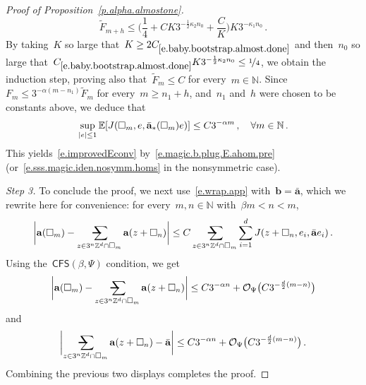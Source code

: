 \documentclass[11pt,twoside]{article} %
\makeatletter
\let\oldsquare\square %
\renewcommand{\square}{\oldsquare}
\numberwithin{equation}{section}
\theoremstyle{definition}
\let\originalleft\left
\let\originalright\right
\renewcommand{\left}{\mathopen{}\mathclose\bgroup\originalleft}
\renewcommand{\right}{\aftergroup\egroup\originalright}
\newcommand*{\N}{\ensuremath{\mathbb{N}}}
\newcommand*{\Zd}{\ensuremath{\mathbb{Z}^d}}
\renewcommand*{\tilde}{\widetilde}
\renewcommand{\b}{\ensuremath{\mathbf{b}}}
\renewcommand{\a}{\mathbf{a}}
\newcommand{\ahom}{\bar{\a}}
\newcommand{\cu}{\square}
\newcommand{\E}{\mathbb{E}}
\renewcommand{\O}{\mathcal{O}}
\newcommand{\avsum}{\mathop{\mathpalette\avsuminner\relax}\displaylimits}
\newcommand\avsuminner[2]{%
  {\sbox0{$\m@th#1\sum$}%
   \vphantom{\usebox0}%
   \ooalign{%
     \hidewidth
     \smash{\,\rule[.23em]{8.8pt}{1.1pt} \relax}%
     \hidewidth\cr
   ~$\m@th#1\sum$\cr
   }%
  }%
}
\newcommand{\CFS}{\mathsf{CFS}}
\makeatother
\begin{document}
\begin{proof}[{Proof of Proposition~\ref{p.alpha.almostone}}]
\begin{equation} 
\label{e.baby.bootstrap.almost.done}
\tilde{F}_{m+h}  \leq \biggl( \frac14 + CK3^{- \frac{1}{2} \kappa_2 n_0} + \frac{C}{K}\biggr) K 3^{-\kappa_1 n_0} \,.
\end{equation}
By taking~$K$ so large that~$ K \geq 2 C_{\eqref{e.baby.bootstrap.almost.done}}$ and then~$n_0$ so large that~$C_{\eqref{e.baby.bootstrap.almost.done}}K3^{- \frac{1}{2} \kappa_2 n_0} \leq \nicefrac14$, we obtain the induction step, proving also that~$\tilde F_{m} \leq C$ for every~$m\in\N$.
Since~$F_m \leq 3^{-\alpha (m-n_1)} \tilde{F}_m$ for every~$m\geq n_1+h$, and~$n_1$ and~$h$ were chosen to be constants above, we deduce that 
\begin{equation}
\label{e.good.J.bound.bootbark}
\sup_{|e| \leq 1}\E \left[ J(\cu_{m},e, \ahom_*(\cu_{m})  e) \right]
\leq 
C 3^{-\alpha m}\,, \quad \forall m\in\N\,.
\end{equation}
This yields~\eqref{e.improvedEconv} by~\eqref{e.magic.b.plug.E.ahom.pre} (or~\eqref{e.sss.magic.iden.nosymm.homs} in the nonsymmetric case). 

\smallskip

\emph{Step 3.} 
To conclude the proof, we next use~\eqref{e.wrap.app} with~$\b = \ahom$, which we rewrite here for convenience: for every~$m,n\in\N$ with~$\beta m < n<m$, 
\begin{align}
\label{e.wrap.app.bark}
\biggl| \a(\cu_m) -  \avsum_{z\in 3^n\Zd\cap\cu_m}
\a(z+\cu_n) \biggr|
\leq 
C  \avsum_{z\in 3^n\Zd\cap\cu_m}
\sum_{i=1}^d
J(z+\cu_n,e_i, \ahom e_i)
\,.
\end{align}
Using the~$\CFS(\beta,\Psi)$ condition, we get 
\begin{equation}
\label{e.fluct.splitting.one}
\biggl| \a(\cu_m) -  \avsum_{z\in 3^n\Zd\cap\cu_m}
\a(z+\cu_n) \biggr|
\leq
C 3^{-\alpha n} +\O_\Psi\bigl( C 3^{- \frac d2(m-n)} \bigr)
\end{equation}
and
\begin{equation}
\label{e.fluct.splitting.two}
\biggl|\avsum_{z\in 3^n\Zd\cap\cu_m}
\a(z+\cu_n) - \ahom \biggr|
\leq
C 3^{-\alpha n} +\O_\Psi\bigl( C 3^{- \frac d2(m-n)} \bigr)
\,.
\end{equation}
Combining the previous two displays completes the proof.   
\end{proof}
\end{document}
